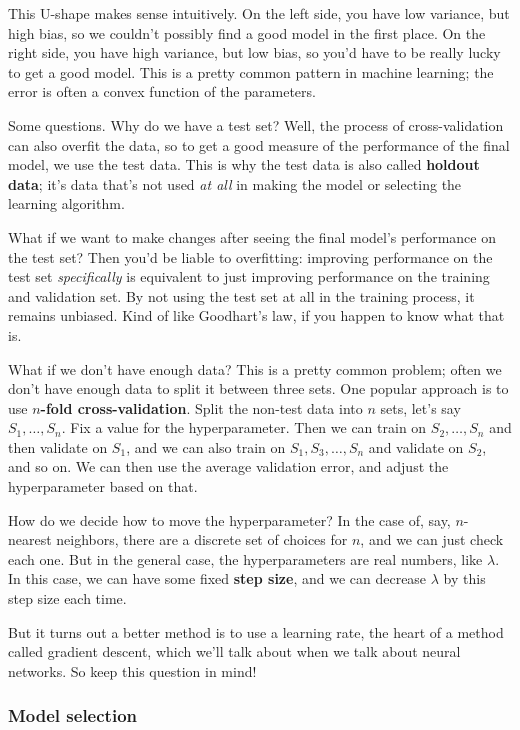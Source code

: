 \documentclass[11pt,paper=letter]{scrartcl}
\begin{document}
This U-shape makes sense intuitively. On the left side, you have low variance, but high bias, so we couldn't possibly find a good model in the first place. On the right side, you have high variance, but low bias, so you'd have to be really lucky to get a good model. This is a pretty common pattern in machine learning; the error is often a convex function of the parameters.

Some questions. Why do we have a test set? Well, the process of cross-validation can also overfit the data, so to get a good measure of the performance of the final model, we use the test data. This is why the test data is also called \textbf{holdout data}; it's data that's not used \textit{at all} in making the model or selecting the learning algorithm.

What if we want to make changes after seeing the final model's performance on the test set? Then you'd be liable to overfitting: improving performance on the test set \textit{specifically} is equivalent to just improving performance on the training and validation set. By not using the test set at all in the training process, it remains unbiased. Kind of like Goodhart's law, if you happen to know what that is.

What if we don't have enough data? This is a pretty common problem; often we don't have enough data to split it between three sets. One popular approach is to use \textbf{$n$-fold cross-validation}. Split the non-test data into $n$ sets, let's say $S_1, \ldots, S_n$. Fix a value for the hyperparameter. Then we can train on $S_2, \ldots, S_n$ and then validate on $S_1$, and we can also train on $S_1, S_3, \ldots, S_n$ and validate on $S_2$, and so on. We can then use the average validation error, and adjust the hyperparameter based on that.

How do we decide how to move the hyperparameter? In the case of, say, $n$-nearest neighbors, there are a discrete set of choices for $n$, and we can just check each one. But in the general case, the hyperparameters are real numbers, like $\lambda$. In this case, we can have some fixed \textbf{step size}, and we can decrease $\lambda$ by this step size each time.

But it turns out a better method is to use a learning rate, the heart of a method called gradient descent, which we'll talk about when we talk about neural networks. So keep this question in mind!

\subsubsection*{Model selection}
\end{document}
